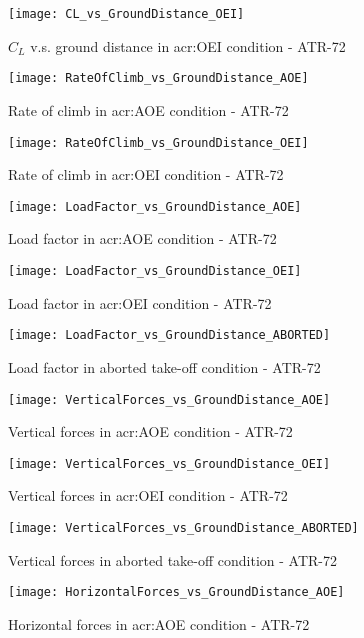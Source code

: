 %
\begin{figure}[H]
\centering
\texttt{[image: CL\_vs\_GroundDistance\_OEI]}
\caption{$C_L$ v.s. ground distance in \gls{acr:OEI} condition - ATR-72}
\end{figure}
%
\begin{figure}[!t]
\centering
\texttt{[image: RateOfClimb\_vs\_GroundDistance\_AOE]}
\caption{Rate of climb in \gls{acr:AOE} condition - ATR-72}
\end{figure}
%
\begin{figure}[!b]
\centering
\texttt{[image: RateOfClimb\_vs\_GroundDistance\_OEI]}
\caption{Rate of climb in \gls{acr:OEI} condition - ATR-72}
\end{figure}
%
\clearpage
%
\begin{figure}[H]
\centering
\texttt{[image: LoadFactor\_vs\_GroundDistance\_AOE]}
\caption{Load factor in \gls{acr:AOE} condition - ATR-72}
\end{figure}
%
\begin{figure}[H]
\centering
\texttt{[image: LoadFactor\_vs\_GroundDistance\_OEI]}
\caption{Load factor in \gls{acr:OEI} condition - ATR-72}
\end{figure}
%
\begin{figure}[H]
\centering
\texttt{[image: LoadFactor\_vs\_GroundDistance\_ABORTED]}
\caption{Load factor in aborted take-off condition - ATR-72}
\end{figure}
%
\begin{figure}[H]
\centering
\texttt{[image: VerticalForces\_vs\_GroundDistance\_AOE]}
\caption{Vertical forces in \gls{acr:AOE} condition - ATR-72}
\end{figure}
%
\begin{figure}[H]
\centering
\texttt{[image: VerticalForces\_vs\_GroundDistance\_OEI]}
\caption{Vertical forces in \gls{acr:OEI} condition - ATR-72}
\end{figure}
%
\begin{figure}[H]
\centering
\texttt{[image: VerticalForces\_vs\_GroundDistance\_ABORTED]}
\caption{Vertical forces in aborted take-off condition - ATR-72}
\end{figure}
%
\begin{figure}[H]
\centering
\texttt{[image: HorizontalForces\_vs\_GroundDistance\_AOE]}
\caption{Horizontal forces in \gls{acr:AOE} condition - ATR-72}
\end{figure}
